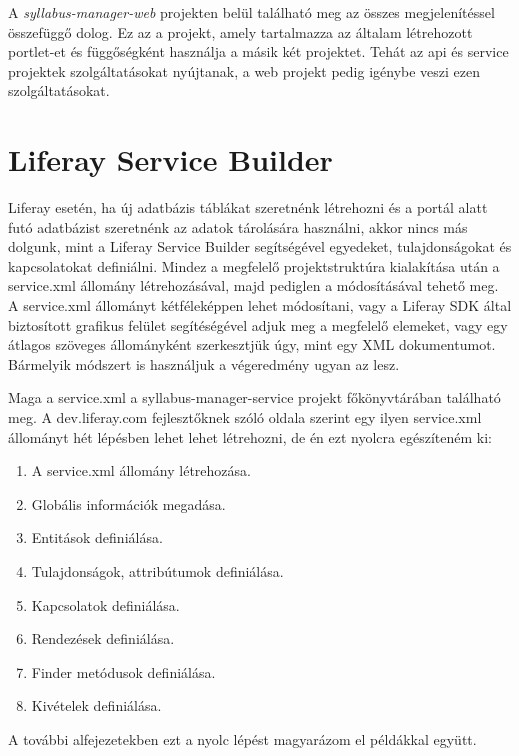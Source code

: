 \documentclass[hidelinks, 12pt, a4paper]{report}
\begin{document}
A \emph{syllabus-manager-web} projekten belül található meg az összes megjelenítéssel összefüggő dolog. Ez az a projekt, amely tartalmazza az általam létrehozott portlet-et és függőségként használja a másik két projektet. Tehát az api és service projektek szolgáltatásokat nyújtanak, a web projekt pedig igénybe veszi ezen szolgáltatásokat.

\section{Liferay Service Builder}

Liferay esetén, ha új adatbázis táblákat szeretnénk létrehozni és a portál alatt futó adatbázist szeretnénk az adatok tárolására használni, akkor nincs más dolgunk, mint a Liferay Service Builder segítségével egyedeket, tulajdonságokat és kapcsolatokat definiálni. Mindez a megfelelő projektstruktúra kialakítása után a service.xml állomány létrehozásával, majd pediglen a módosításával tehető meg. A service.xml állományt kétféleképpen lehet módosítani, vagy a Liferay SDK által biztosított grafikus felület segítéségével adjuk meg a megfelelő elemeket, vagy egy átlagos szöveges állományként szerkesztjük úgy, mint egy XML dokumentumot. Bármelyik módszert is használjuk a végeredmény ugyan az lesz.

Maga a service.xml a syllabus-manager-service projekt főkönyvtárában található meg. A dev.liferay.com fejlesztőknek szóló oldala szerint egy ilyen service.xml állományt hét lépésben lehet lehet létrehozni, de én ezt nyolcra egészíteném ki:
\begin{enumerate}
\item A service.xml állomány létrehozása.
\item Globális információk megadása.
\item Entitások definiálása.
\item Tulajdonságok, attribútumok definiálása.
\item Kapcsolatok definiálása.
\item Rendezések definiálása.
\item Finder metódusok definiálása.
\item Kivételek definiálása.
\end{enumerate}


A további alfejezetekben ezt a nyolc lépést magyarázom el példákkal együtt.
\end{document}
